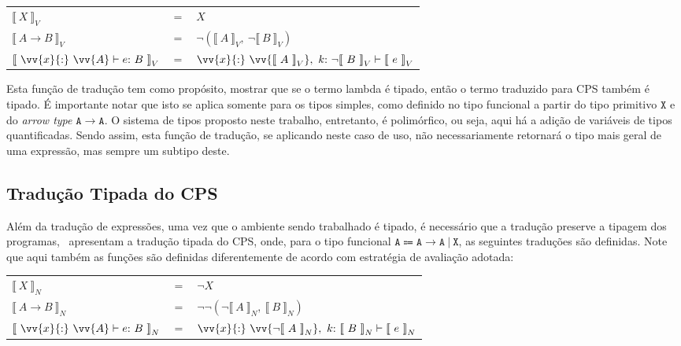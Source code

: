 \phantom{Newline}

\begin{tabular}{lcl}
     ${\llbracket\ X\ \rrbracket}_V$ & $=$ & $X$ \\ 
     ${\llbracket\ A \rightarrow B\ \rrbracket}_V$ & $=$ & $\neg({\llbracket\ A\ \rrbracket}_V,\ \neg{\llbracket\ B\ \rrbracket}_V)$ \\ 
     ${\llbracket\ \vv{x}{:}\ \vv{A} \vdash e{:}\ B\ \rrbracket}_V$ & $=$ & $\vv{x}{:}\ \vv{{\llbracket\ A\ \rrbracket}_V},\ k{:}\ \neg{\llbracket\ B\ \rrbracket}_V \vdash {\llbracket\ e\ \rrbracket}_V$ \\ 
\end{tabular}

\phantom{Newline}

\noindent Esta função de tradução tem como propósito, mostrar que se o termo lambda é tipado, então o termo traduzido para CPS também é tipado.
É importante notar que isto se aplica somente para os tipos simples, como definido no tipo funcional a partir do tipo primitivo $\mathtt{X}$ e do \textit{arrow type} $\mathtt{A \to A}$.
O sistema de tipos proposto neste trabalho, entretanto, é polimórfico, ou seja, aqui há a adição de variáveis de tipos quantificadas.
Sendo assim, esta função de tradução, se aplicando neste caso de uso, não necessariamente retornará o tipo mais geral de uma expressão, mas sempre um subtipo deste.

\subsection{Tradução Tipada do CPS}\label{subsec:typed-cps-translation}
Além da tradução de expressões, uma vez que o ambiente sendo trabalhado é tipado, é necessário que a tradução preserve a tipagem dos programas,~ apresentam a tradução tipada do CPS, onde, para o tipo funcional $\mathtt{A \Coloneqq A \to A\ |\ X}$, as seguintes traduções são definidas.
Note que aqui também as funções são definidas diferentemente de acordo com estratégia de avaliação adotada:

\phantom{Newline}

\begin{tabular}{lcl}
     ${\llbracket\ X\ \rrbracket}_N$ & $=$ & $\neg X$ \\ 
     ${\llbracket\ A \rightarrow B\ \rrbracket}_N$ & $=$ & $\neg\neg(\neg{\llbracket\ A\ \rrbracket}_N,\ {\llbracket\ B\ \rrbracket}_N)$ \\ 
     ${\llbracket\ \vv{x}{:}\ \vv{A} \vdash e{:}\ B\ \rrbracket}_N$ & $=$ & $\vv{x}{:}\ \vv{\neg{\llbracket\ A\ \rrbracket}_N},\ k{:}\ {\llbracket\ B\ \rrbracket}_N \vdash {\llbracket\ e\ \rrbracket}_N$ \\ 
\end{tabular}

